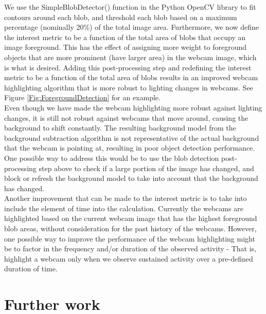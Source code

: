 \documentclass{article}
\begin{document}
We use the SimpleBlobDetector() function in the Python OpenCV library to fit contours around each blob, and threshold each blob based on a maximum percentage (nominally 20\%) of the total image area. Furthermore, we now define the interest metric to be a function of the total area of blobs that occupy an image foreground. This has the effect of assigning more weight to foreground objects that are more prominent (have larger area) in the webcam image, which is what is desired. Adding this post-processing step and redefining the interest metric to be a function of the total area of blobs results in an improved webcam highlighting algorithm that is more robust to lighting changes in webcams. See Figure \ref{Fig:ForegroundDetection} for an example. \\

Even though we have made the webcam highlighting more robust against lighting changes, it is still not robust against webcams that move around, causing the background to shift constantly. The resulting background model from the background subtraction algorithm is not representative of the actual background that the webcam is pointing at, resulting in poor object detection performance. One possible way to address this would be to use the blob detection post-processing step above to check if a large portion of the image has changed, and block or refresh the background model to take into account that the background has changed.\\

Another improvement that can be made to the interest metric is to take into include the element of time into the calculation. Currently the webcams are highlighted based on the current webcam image that has the highest foreground blob areas, without consideration for the past history of the webcams. However, one possible way to improve the performance of the webcam highlighting might be to factor in the frequency and/or duration of the observed activity - That is, highlight a webcam only when we observe sustained activity over a pre-defined duration of time. 

\section{Further work}

\newpage
\end{document}
